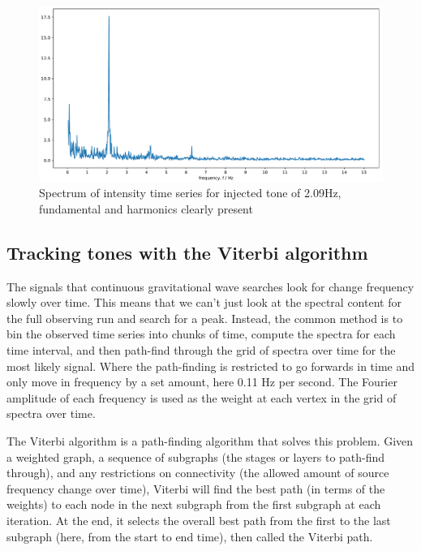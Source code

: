 \documentclass[prb,preprint]{revtex4-1}
\begin{document}
\begin{figure}
	\includegraphics[width=\textwidth]{webcam_expt_4_0209-cropped.pdf}
	\caption{Spectrum of intensity time series for injected tone of 2.09Hz, fundamental and harmonics clearly present}
	\label{fig:webcam_spectrum}
\end{figure}

\subsection{Tracking tones with the Viterbi algorithm}

The signals that continuous gravitational wave searches look for change frequency slowly over time. This means that we can’t just look at the spectral content for the full observing run and search for a peak. Instead, the common method is to bin the observed time series into chunks of time, compute the spectra for each time interval, and then path-find through the grid of spectra over time for the most likely signal. Where the path-finding is restricted to go forwards in time and only move in frequency by a set amount, here 0.11 Hz per second. The Fourier amplitude of each frequency is used as the weight at each vertex in the grid of spectra over time.


The Viterbi algorithm is a path-finding algorithm that solves this problem. Given a weighted graph, a sequence of subgraphs (the stages or layers to path-find through), and any restrictions on connectivity (the allowed amount of source frequency change over time), Viterbi will find the best path (in terms of the weights) to each node in the next subgraph from the first subgraph at each iteration. At the end, it selects the overall best path from the first to the last subgraph (here, from the start to end time), then called the Viterbi path.
\end{document}
